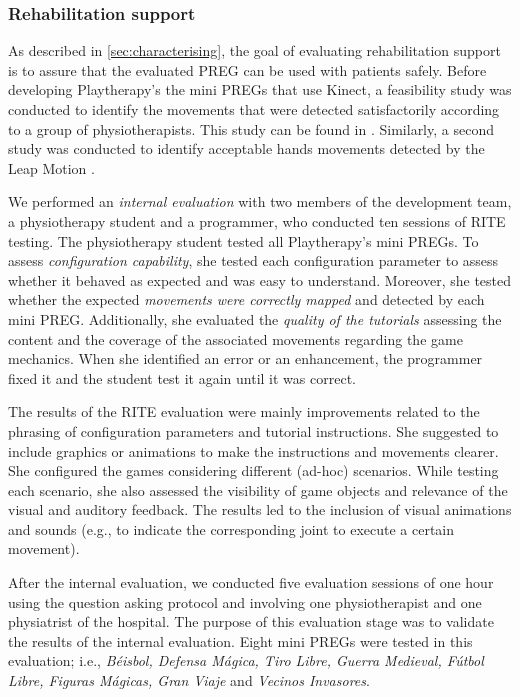 \subsubsection{Rehabilitation support}
As described in \autoref{sec:characterising}, the goal of evaluating rehabilitation support is to assure that the evaluated \ac{PREG} can be used with patients safely. Before developing Playtherapy's the mini \acp{PREG} that use Kinect, a feasibility study was conducted to identify the movements that were detected satisfactorily according to a group of physiotherapists. This study can be found in \autocite{Prado2018}. Similarly, a second study was conducted to identify acceptable hands movements detected by the Leap Motion \autocite{Lopez2017}.

We performed an \emph{internal evaluation} with two members of the development team, a physiotherapy student and a programmer, who conducted ten sessions of \ac{RITE} testing. The physiotherapy student tested all Playtherapy's mini \acp{PREG}. To assess \textit{configuration capability}, she tested each configuration parameter to assess whether it behaved as expected and was easy to understand. Moreover, she tested whether the expected \textit{movements were correctly mapped} and detected by each mini \ac{PREG}. Additionally, she evaluated the \textit{quality of the tutorials} assessing the content and the coverage of the associated movements regarding the game mechanics. When she identified an error or an enhancement, the programmer fixed it and the student test it again until it was correct.

The results of the \ac{RITE} evaluation were mainly improvements related to the phrasing of configuration parameters and tutorial instructions. She suggested to include graphics or animations to make the instructions and movements clearer. She configured the games considering different (ad-hoc) scenarios. While testing each scenario, she also assessed the visibility of game objects and relevance of the visual and auditory feedback. The results led to the inclusion of visual animations and sounds (e.g., to indicate the corresponding joint to execute a certain movement).

After the internal evaluation, we conducted five evaluation sessions of one hour using the question asking protocol and involving one physiotherapist and one physiatrist of the hospital. The purpose of this evaluation stage was to validate the results of the internal evaluation. Eight mini \acp{PREG} were tested in this evaluation; i.e., \textit{Béisbol, Defensa M\'agica, Tiro Libre, Guerra Medieval, F\'utbol Libre, Figuras Mágicas, Gran Viaje} and \textit{Vecinos Invasores}.

